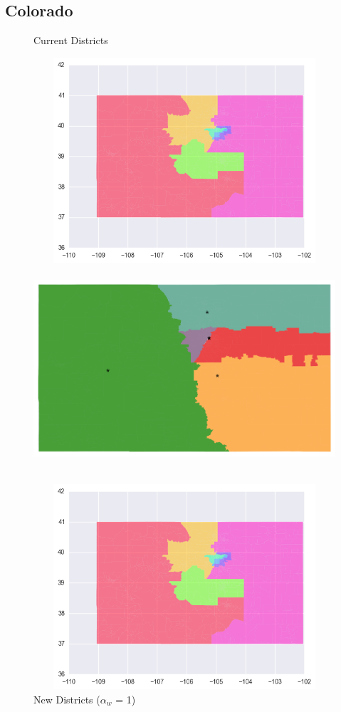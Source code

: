 \clearpage
\newpage

\subsection{Colorado}
\begin{figure}[htb!] \centering
\caption{ Current Districts }
\includegraphics[width=5in,height=3in,keepaspectratio]{../maps/CO/static/before.png}
\includegraphics[width=5in,height=3in,keepaspectratio]{../maps/CO/static/0_0_after.png}
\caption{ New Districts ($\alpha_w$ = 1) }
\includegraphics[width=5in,height=3in,keepaspectratio]{../maps/CO/static/before.png}

\end{figure}
